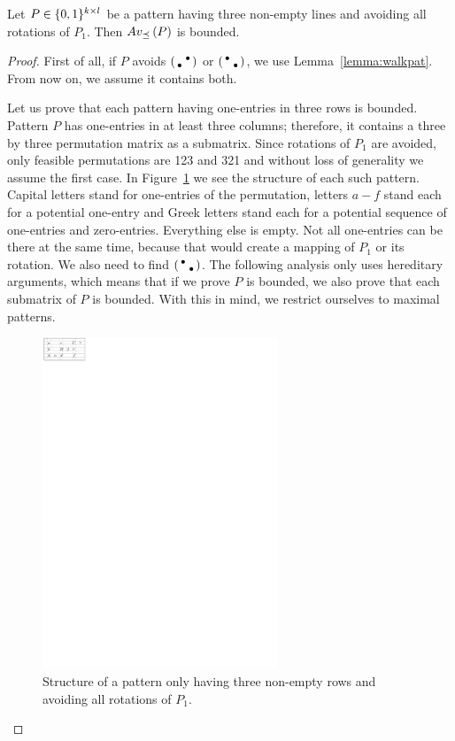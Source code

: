\begin{lemma}
Let $P\in\{0,1\}^{k\times l}$ be a pattern having three non-empty lines and avoiding all rotations of $P_1$. Then $Av_{\preceq}\left(P\right)$ is bounded.
\end{lemma}
\begin{proof}
First of all, if $P$ avoids $\left(\begin{smallmatrix} &\bullet\\\bullet& \end{smallmatrix}\right)$ or $\left(\begin{smallmatrix}\bullet& \\ &\bullet\end{smallmatrix}\right)$, we use Lemma~\ref{lemma:walkpat}. From now on, we assume it contains both.

Let us prove that each pattern having one-entries in three rows is bounded. Pattern $P$ has one-entries in at least three columns; therefore, it contains a three by three permutation matrix as a submatrix. Since rotations of $P_1$ are avoided, only feasible permutations are 123 and 321 and without loss of generality we assume the first case. In Figure~\ref{fig:threelines} we see the structure of each such pattern. Capital letters stand for one-entries of the permutation, letters $a-f$ stand each for a potential one-entry and Greek letters stand each for a potential sequence of one-entries and zero-entries. Everything else is empty. Not all one-entries can be there at the same time, because that would create a mapping of $P_1$ or its rotation. We also need to find $\left(\begin{smallmatrix}\bullet& \\ &\bullet\end{smallmatrix}\right)$. The following analysis only uses hereditary arguments, which means that if we prove $P$ is bounded, we also prove that each submatrix of $P$ is bounded. With this in mind, we restrict ourselves to maximal patterns.
\begin{figure}[!ht]
	\centering
	\includegraphics[width=70mm]{img/threelines.pdf}
	\caption{Structure of a pattern only having three non-empty rows and avoiding all rotations of $P_1$.}
	\label{fig:threelines}
\end{figure}


\end{proof}
